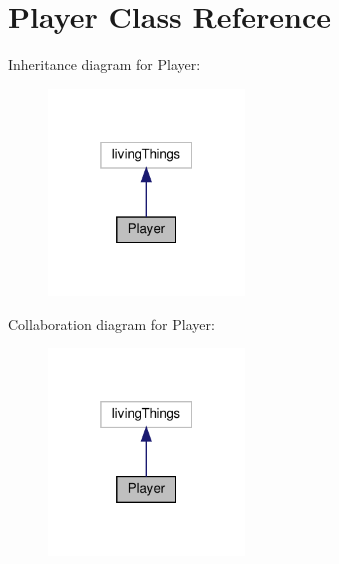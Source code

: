 \hypertarget{classPlayer}{}\section{Player Class Reference}
\label{classPlayer}


Inheritance diagram for Player\+:
\nopagebreak
\begin{figure}[H]
\begin{center}
\leavevmode
\includegraphics[width=148pt]{classPlayer__inherit__graph}
\end{center}
\end{figure}


Collaboration diagram for Player\+:
\nopagebreak
\begin{figure}[H]
\begin{center}
\leavevmode
\includegraphics[width=148pt]{classPlayer__coll__graph}
\end{center}
\end{figure}
